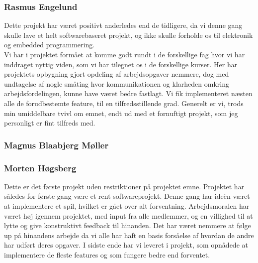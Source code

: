\subsubsection{Rasmus Engelund}
Dette projekt har været positivt anderledes end de tidligere, da vi denne gang skulle lave et helt softwarebaseret projekt, og ikke skulle forholde os til elektronik og embedded programmering.\\
Vi har i projektet formået at komme godt rundt i de forskellige fag hvor vi har inddraget nyttig viden, som vi har tilegnet os i de forskellige kurser. Her har projektets opbygning gjort opdeling af arbejdsopgaver nemmere, dog med undtagelse af nogle småting hvor kommunikationen og klarheden omkring arbejdsfordelingen, kunne have været bedre fastlagt.
Vi fik implementeret næsten alle de forudbestemte feature, til en tilfredsstillende grad.
Generelt er vi, trods min umiddelbare tvivl om emnet, endt ud med et fornuftigt projekt, som jeg personligt er fint tilfreds med. 

\subsubsection{Magnus Blaabjerg Møller}

\subsubsection{Morten Høgsberg}
Dette er det første projekt uden restriktioner på projektet emne. Projektet har således for første gang
være et rent softwareprojekt. Denne gang har ideèn været at implementere et spil, hvilket er gået over
alt forventning. Arbejdsmoralen har været høj igennem projektet, med input fra alle medlemmer, og en
villighed til at lytte og give konstruktivt feedback til hinanden.
Det har været nemmere at følge up på hinandens arbejde da vi alle har haft en basis forsåelse af hvordan 
de andre har udført deres opgaver. I sidste ende har vi leveret i projekt, som opnådede at implementere
de fleste features og som fungere bedre end forventet. 
